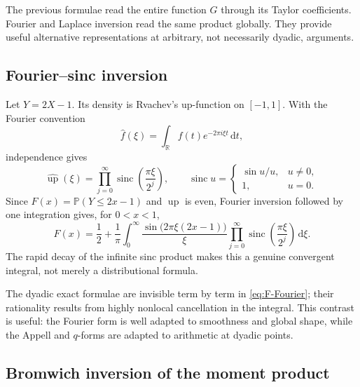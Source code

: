 \documentclass[11pt,oneside]{article}
\theoremstyle{definition}
\theoremstyle{remark}
\newcommand{\R}{\mathbb R}
\newcommand{\Prob}{\mathbb P}
\newcommand{\dd}{\,\mathrm d}
\newcommand{\Up}{\operatorname{up}}
\newcommand{\sinc}{\operatorname{sinc}}
\begin{document}
The previous formulae read the entire function $G$ through its Taylor
coefficients.  Fourier and Laplace inversion read the same product globally.
They provide useful alternative representations at arbitrary, not necessarily
dyadic, arguments.

\subsection{Fourier--sinc inversion}

Let $Y=2X-1$.  Its density is Rvachev's up-function on $[-1,1]$.  With the
Fourier convention
\[
 \widehat f(\xi)=\int_{\R}f(t)e^{-2\pi i\xi t}\dd t,
\]
independence gives
\begin{equation}\label{eq:up-Fourier}
 \widehat{\Up}(\xi)
 =\prod_{j=0}^{\infty}
 \sinc\!\left(\frac{\pi\xi}{2^j}\right),
 \qquad
 \sinc u=\begin{cases}\sin u/u,&u\ne0,\\1,&u=0.\end{cases}
\end{equation}
Since $F(x)=\Prob(Y\le2x-1)$ and $\Up$ is even,
Fourier inversion followed by one integration gives, for $0<x<1$,
\begin{equation}\label{eq:F-Fourier}
 \boxed{
 F(x)=\frac12+\frac1\pi\int_0^{\infty}
 \frac{\sin\bigl(2\pi\xi(2x-1)\bigr)}{\xi}
 \prod_{j=0}^{\infty}
 \sinc\!\left(\frac{\pi\xi}{2^j}\right)\dd\xi.}
\end{equation}
The rapid decay of the infinite sinc product makes this a genuine convergent
integral, not merely a distributional formula.

The dyadic exact formulae are invisible term by term in
\eqref{eq:F-Fourier}; their rationality results from highly nonlocal
cancellation in the integral.  This contrast is useful: the Fourier form is
well adapted to smoothness and global shape, while the Appell and $q$-forms are
adapted to arithmetic at dyadic points.

\subsection{Bromwich inversion of the moment product}
\end{document}
